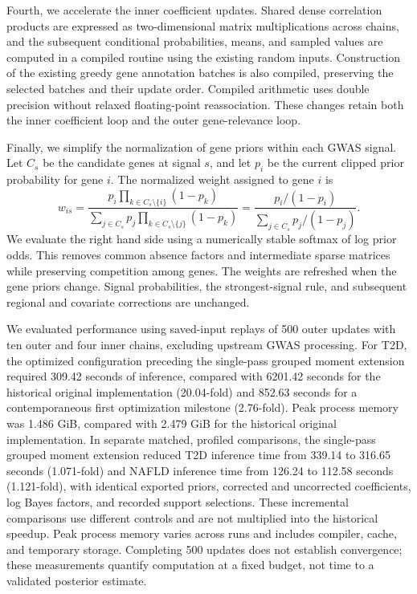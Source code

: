 \documentclass[11pt]{article}
\begin{document}
{Fourth, we accelerate the inner coefficient updates. Shared dense
correlation products are expressed as two-dimensional matrix
multiplications across chains, and the subsequent conditional
probabilities, means, and sampled values are computed in a compiled
routine using the existing random inputs. Construction of the existing
greedy gene annotation batches is also compiled, preserving the selected
batches and their update order. Compiled arithmetic uses double precision
without relaxed floating-point reassociation. These changes retain both
the inner coefficient loop and the outer gene-relevance loop.

Finally, we simplify the normalization of gene priors within each GWAS
signal. Let $C_s$ be the candidate genes at signal $s$, and let $p_i$ be
the current clipped prior probability for gene $i$. The normalized weight
assigned to gene $i$ is
\[
 w_{is}=\frac{p_i\prod_{k\in C_s\setminus\{i\}}(1-p_k)}
 {\sum_{j\in C_s}p_j\prod_{k\in C_s\setminus\{j\}}(1-p_k)}
 =\frac{p_i/(1-p_i)}{\sum_{j\in C_s}p_j/(1-p_j)}.
\]
We evaluate the right hand side using a numerically stable softmax of
log prior odds. This removes common absence factors and intermediate
sparse matrices while preserving competition among genes. The weights
are refreshed when the gene priors change. Signal probabilities, the
strongest-signal rule, and subsequent regional and covariate corrections
are unchanged.

We evaluated performance using saved-input replays of 500 outer updates
with ten outer and four inner chains, excluding upstream GWAS processing.
For T2D, the optimized configuration preceding the single-pass grouped
moment extension required 309.42 seconds of inference, compared with
6201.42 seconds for the historical original implementation (20.04-fold)
and 852.63 seconds for a contemporaneous first optimization milestone
(2.76-fold). Peak process memory was 1.486 GiB, compared with 2.479 GiB
for the historical original implementation. In separate matched,
profiled comparisons, the single-pass grouped moment extension reduced
T2D inference time from 339.14 to 316.65 seconds (1.071-fold) and NAFLD
inference time from 126.24 to 112.58 seconds (1.121-fold), with identical
exported priors, corrected and uncorrected coefficients, log Bayes
factors, and recorded support selections. These incremental comparisons
use different controls and are not multiplied into the historical
speedup. Peak process memory varies across runs and includes compiler,
cache, and temporary storage. Completing 500 updates does not establish
convergence; these measurements quantify computation at a fixed budget,
not time to a validated posterior estimate.

}
\end{document}
